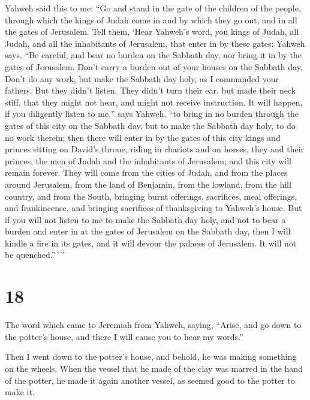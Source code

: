  Yahweh said this to me: ``Go and stand in the gate of
the children of the people, through which the kings of Judah come in and
by which they go out, and in all the gates of Jerusalem. 
Tell them, `Hear Yahweh's word, you kings of Judah, all Judah, and all
the inhabitants of Jerusalem, that enter in by these gates:
 Yahweh says, ``Be careful, and bear no burden on the
Sabbath day, nor bring it in by the gates of Jerusalem. 
Don't carry a burden out of your houses on the Sabbath day. Don't do any
work, but make the Sabbath day holy, as I commanded your fathers.
 But they didn't listen. They didn't turn their ear, but
made their neck stiff, that they might not hear, and might not receive
instruction.  It will happen, if you diligently listen to
me,'' says Yahweh, ``to bring in no burden through the gates of this
city on the Sabbath day, but to make the Sabbath day holy, to do no work
therein;  then there will enter in by the gates of this
city kings and princes sitting on David's throne, riding in chariots and
on horses, they and their princes, the men of Judah and the inhabitants
of Jerusalem; and this city will remain forever.  They
will come from the cities of Judah, and from the places around
Jerusalem, from the land of Benjamin, from the lowland, from the hill
country, and from the South, bringing burnt offerings, sacrifices, meal
offerings, and frankincense, and bringing sacrifices of thanksgiving to
Yahweh's house.  But if you will not listen to me to make
the Sabbath day holy, and not to bear a burden and enter in at the gates
of Jerusalem on the Sabbath day, then I will kindle a fire in its gates,
and it will devour the palaces of Jerusalem. It will not be
quenched.''\,'\,''

\hypertarget{section-17}{%
\section{18}\label{section-17}}

 The word which came to Jeremiah from Yahweh, saying,
 ``Arise, and go down to the potter's house, and there I
will cause you to hear my words.''

 Then I went down to the potter's house, and behold, he
was making something on the wheels.  When the vessel that
he made of the clay was marred in the hand of the potter, he made it
again another vessel, as seemed good to the potter to make it.

